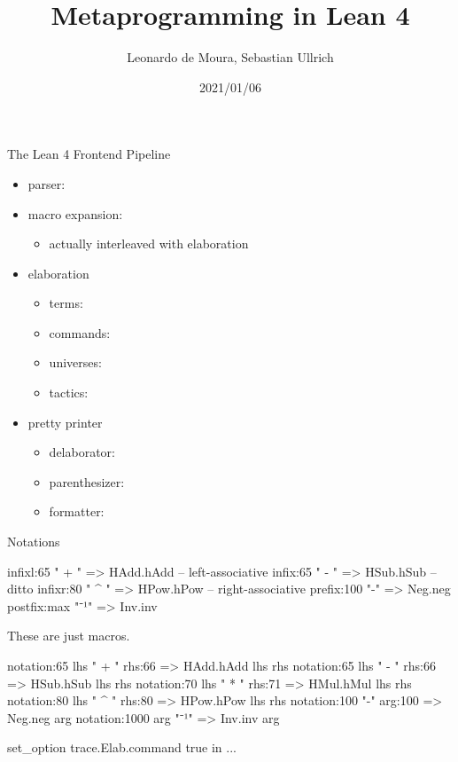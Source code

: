 \documentclass[t]{beamer}
\title{Metaprogramming in Lean 4}
\author[Ullrich, de Moura]{Leonardo de Moura\inst{1}, Sebastian Ullrich\inst{2}}
\subtitle{\insertauthor}
\institute[]{\inst{1}Microsoft Research, USA\ \ \ \inst{2}KIT, Germany}
\date{2021/01/06}
\begin{document}
\begin{frame}
  \maketitle
\end{frame}

\begin{frame}[fragile]{The Lean 4 Frontend Pipeline}
  \begin{itemize}
  \item parser: 
  \item macro expansion: 
    \begin{itemize}
    \item actually interleaved with elaboration
    \end{itemize}
  \item elaboration
    \begin{itemize}
    \item terms: 
    \item commands: 
    \item universes: 
    \item tactics: 
    \end{itemize}
    \pause
  \item pretty printer
    \begin{itemize}
    \item delaborator: 
    \item parenthesizer: 
    \item formatter: 
    \end{itemize}
  \end{itemize}
\end{frame}

\begin{frame}[fragile]{Notations}
\begin{leancode}
infixl:65 " + "  => HAdd.hAdd  -- left-associative
infix:65  " - "  => HSub.hSub  -- ditto
infixr:80 " ^ "  => HPow.hPow  -- right-associative
prefix:100 "-"   => Neg.neg
postfix:max "⁻¹" => Inv.inv
\end{leancode}
  \pause
  These are just macros.
\begin{leancode}
notation:65 lhs " + " rhs:66 => HAdd.hAdd lhs rhs
notation:65 lhs " - " rhs:66 => HSub.hSub lhs rhs
notation:70 lhs " * " rhs:71 => HMul.hMul lhs rhs
notation:80 lhs " ^ " rhs:80 => HPow.hPow lhs rhs
notation:100 "-" arg:100 => Neg.neg arg
notation:1000 arg "⁻¹" => Inv.inv arg
\end{leancode}
  \pause
\begin{leancode}
set_option trace.Elab.command true in
...
\end{leancode}
\end{frame}
\end{document}
